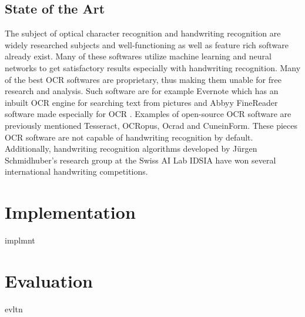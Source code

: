 \documentclass{article}
\begin{document}
    \subsection{State of the Art}
      The subject of optical character recognition and handwriting recognition are widely researched subjects and well-functioning as well as feature rich software already exist. Many of these softwares utilize machine learning and neural networks to get satisfactory results especially with handwriting recognition. Many of the best OCR softwares are proprietary, thus making them unable for free research and analysis. Such software are for example Evernote which has an inbuilt OCR engine for searching text from pictures \cite{Kelly} and Abbyy FineReader software made especially for OCR \cite{ABBYY}. Examples of open-source OCR software are previously mentioned Tesseract\cite{Smith2007a}, OCRopus\cite{Breuel2007}, Ocrad \cite{FreeSoftwareFoundation2016} and CuneinForm\cite{CognitiveTechnologies2016}. These pieces OCR software are not capable of handwriting recognition by default. Additionally, handwriting recognition algorithms developed by Jürgen Schmidhuber's research group at the Swiss AI Lab IDSIA have won several international handwriting competitions\cite{Angelica}.



  \newpage
  \section{Implementation}
  implmnt

  \newpage
  \section{Evaluation}
  evltn

  \newpage
  
  
\end{document}
